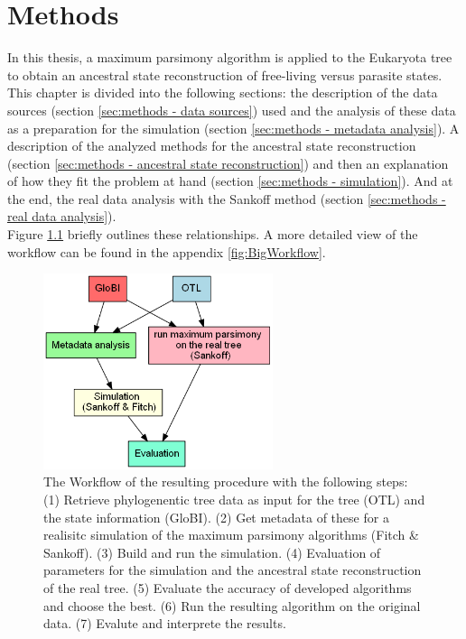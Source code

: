 \chapter{Methods}
  In this thesis, a maximum parsimony algorithm is applied to the Eukaryota tree to obtain an 
    ancestral state reconstruction of free-living versus parasite states. \\
  This chapter is divided into the following sections: the description of the data sources 
    (section \ref{sec:methods - data sources}) used and the analysis of these data as a preparation 
    for the simulation (section \ref{sec:methods - metadata analysis}). A description of the 
    analyzed methods for the ancestral state reconstruction (section 
    \ref{sec:methods - ancestral state reconstruction}) and then an explanation of how they fit the 
    problem at hand (section \ref{sec:methods - simulation}). And at the end, the real data analysis 
    with the Sankoff method (section \ref{sec:methods - real data analysis}). \\
  Figure \ref{fig:workflow} briefly outlines these relationships. A more detailed view of the 
    workflow can be found in the appendix \ref{fig:BigWorkflow}.
  \begin{figure}[h!]
    \centering
    \includegraphics[width=0.6\textwidth]{Figures/Workflow-overview.png}
    \caption{The Workflow of the resulting procedure with the following steps: \\
      (1) Retrieve phylogenentic tree data as input for the tree (OTL) and the state information (GloBI).
      (2) Get metadata of these for a realisitc simulation of the maximum parsimony algorithms (Fitch \& Sankoff).
      (3) Build and run the simulation.
      (4) Evaluation of parameters for the simulation and the ancestral state reconstruction of the real tree.
      (5) Evaluate the accuracy of developed algorithms and choose the best.
      (6) Run the resulting algorithm on the original data.
      (7) Evalute and interprete the results. %
    }
    \label{fig:workflow}
  \end{figure}
  
